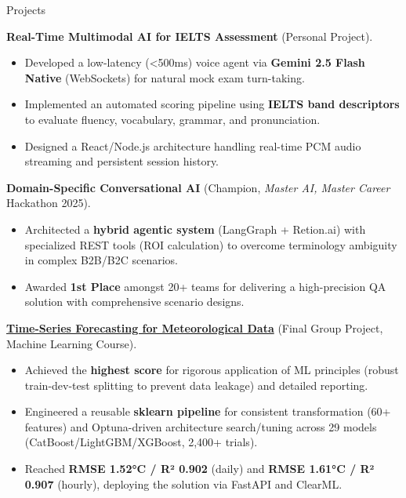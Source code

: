 \begin{rubric}{Projects}

    \textbf{Real-Time Multimodal AI for IELTS Assessment} (Personal Project).
    \begin{itemize}
        \item Developed a low-latency (<500ms) voice agent via \textbf{Gemini 2.5 Flash Native} (WebSockets) for natural mock exam turn-taking.
        \item Implemented an automated scoring pipeline using \textbf{IELTS band descriptors} to evaluate fluency, vocabulary, grammar, and pronunciation.
        \item Designed a React/Node.js architecture handling real-time PCM audio streaming and persistent session history.
    \end{itemize}
    \textbf{Domain-Specific Conversational AI} (Champion, \textit{Master AI, Master Career} Hackathon 2025).
    \begin{itemize}
        \item Architected a \textbf{hybrid agentic system} (LangGraph + Retion.ai) with specialized REST tools (ROI calculation) to overcome terminology ambiguity in complex B2B/B2C scenarios.
        \item Awarded \textbf{1st Place} amongst 20+ teams for delivering a high-precision QA solution with comprehensive scenario designs.
    \end{itemize}
    \href{https://github.com/tlong-ds/hanoi-weather-forecast}{\textbf{Time-Series Forecasting for Meteorological Data}} (Final Group Project, Machine Learning Course).
    \begin{itemize}
        \item Achieved the \textbf{highest score} for rigorous application of ML principles (robust train-dev-test splitting to prevent data leakage) and detailed reporting.
        \item Engineered a reusable \textbf{sklearn pipeline} for consistent transformation (60+ features) and Optuna-driven architecture search/tuning across 29 models (CatBoost/LightGBM/XGBoost, 2,400+ trials).
        \item Reached \textbf{RMSE 1.52°C / R² 0.902} (daily) and \textbf{RMSE 1.61°C / R² 0.907} (hourly), deploying the solution via FastAPI and ClearML.
    \end{itemize}

\end{rubric}

